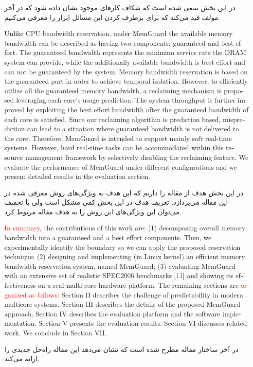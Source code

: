 \documentclass[a4paper, 11pt]{article}
\begin{document}
در  این بخش سعی شده است که شکاف کار‌های موجود نشان داده شود که در آخر
مولف قید می‌کند که برای برطرف کردن این مسائل ابزار
را معرفی می‌کنیم.
\begin{latin}
    Unlike CPU bandwidth reservation, under MemGuard the
    available memory bandwidth can be described as having
    two components: guaranteed and best effort. The guaranteed
    bandwidth represents the minimum service rate the DRAM
    system can provide, while the additionally available bandwidth
    is best effort and can not be guaranteed by the system. Memory
    bandwidth reservation is based on the guaranteed part in order
    to achieve temporal isolation. However, to efficiently utilize all
    the guaranteed memory bandwidth, a reclaiming mechanism is
    proposed leveraging each core’s usage prediction. The system
    throughput is further improved by exploiting the best effort
    bandwidth after the guaranteed bandwidth of each core is
    satisfied.
    Since our reclaiming algorithm is prediction based, misprediction can
    lead to a situation where guaranteed bandwidth is
    not delivered to the core. Therefore, MemGuard is intended to
    support mainly soft real-time systems. However, hard real-time
    tasks can be accommodated within this resource management
    framework by selectively disabling the reclaiming feature.
    We evaluate the performance of MemGuard under different
    configurations and we present detailed results in the evaluation
    section.
\end{latin}
در این بخش هدف از مقاله را داریم که این هدف به ویژگی‌های روش معرفی شده در این مقاله
می‌پردازد.
تعریف هدف در این بخش کمی مشکل است ولی با تخفیف می‌توان این ویژگی‌های این روش
را به هدف مقاله مربوط کرد.
\begin{latin}
\textcolor{red}{In summary}, the contributions of this work are: (1)
decomposing overall memory bandwidth into a guaranteed and a
best effort components. Then, we experimentally identify the
boundary so we can apply the proposed reservation technique;
(2) designing and implementing (in Linux kernel) an efficient
memory bandwidth reservation system, named MemGuard;
(3) evaluating MemGuard with an extensive set of realistic
SPEC2006 benchmarks [11] and showing its effectiveness on
a real multi-core hardware platform.
The remaining sections are \textcolor{red}{organized as follows}: Section
II describes the challenge of predictability in modern multicore systems.
Section III describes the details of the proposed
MemGuard approach. Section IV describes the evaluation
platform and the software implementation. Section V presents
the evaluation results. Section VI discusses related work. We
conclude in Section VII.
\end{latin}
در آخر ساختار مقاله مطرح شده است که نشان می‌دهد این مقاله راه‌حل جدیدی را ارائه می‌کند.

\end{document}
